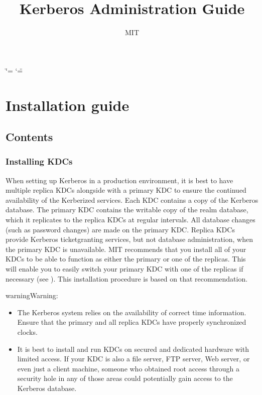 \documentclass[letterpaper,10pt,english]{sphinxmanual}
\title{Kerberos Administration Guide}
\date{ }
\author{MIT}
\begin{document}
\ifdefined\shorthandoff
  \ifnum\catcode`\=\string=\active\shorthandoff{=}\fi
  \ifnum\catcode`\"=\active{}\fi
\fi

\pagestyle{empty}
\sphinxmaketitle
\pagestyle{plain}
\sphinxtableofcontents
\pagestyle{normal}
\label{\detokenize{admin/index::doc}}


\sphinxstepscope


\chapter{Installation guide}
\label{\detokenize{admin/install:installation-guide}}\label{\detokenize{admin/install::doc}}

\section{Contents}
\label{\detokenize{admin/install:contents}}
\sphinxstepscope


\subsection{Installing KDCs}
\label{\detokenize{admin/install_kdc:installing-kdcs}}\label{\detokenize{admin/install_kdc::doc}}
\sphinxAtStartPar
When setting up Kerberos in a production environment, it is best to
have multiple replica KDCs alongside with a primary KDC to ensure the
continued availability of the Kerberized services.  Each KDC contains
a copy of the Kerberos database.  The primary KDC contains the
writable copy of the realm database, which it replicates to the
replica KDCs at regular intervals.  All database changes (such as
password changes) are made on the primary KDC.  Replica KDCs provide
Kerberos ticket\sphinxhyphen{}granting services, but not database administration,
when the primary KDC is unavailable.  MIT recommends that you install
all of your KDCs to be able to function as either the primary or one
of the replicas.  This will enable you to easily switch your primary
KDC with one of the replicas if necessary (see
{\hyperref[\detokenize{admin/install_kdc:switch-primary-replica}]{}}).  This installation procedure is based
on that recommendation.

\begin{sphinxadmonition}{warning}{Warning:}\begin{itemize}
\item {} 
\sphinxAtStartPar
The Kerberos system relies on the availability of correct time
information.  Ensure that the primary and all replica KDCs have
properly synchronized clocks.

\item {} 
\sphinxAtStartPar
It is best to install and run KDCs on secured and dedicated
hardware with limited access.  If your KDC is also a file
server, FTP server, Web server, or even just a client machine,
someone who obtained root access through a security hole in any
of those areas could potentially gain access to the Kerberos
database.

\end{itemize}
\end{sphinxadmonition}
\end{document}

